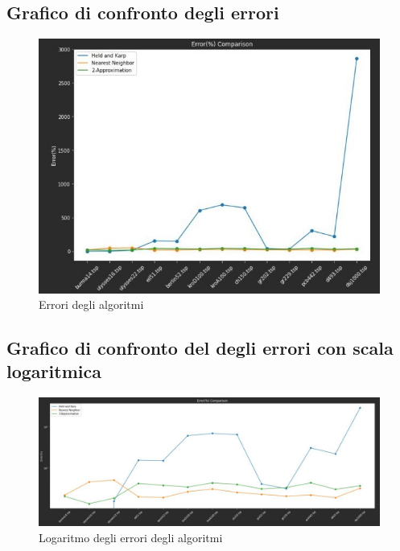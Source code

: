 \subsection{Grafico di confronto degli errori}
\begin{center}
	\begin{figure}[H]
		\centering
		\hspace{-1cm}\includegraphics[width=12cm]{Img/graph_error.jpg}
		\caption{Errori degli algoritmi}
	\end{figure}
\end{center}

\subsection{Grafico di confronto del degli errori con scala logaritmica}
\begin{center}
	\begin{figure}[H]
		\centering
		\hspace{-1cm}\includegraphics[width=16cm]{Img/graph_logerror.jpg}
		\caption{Logaritmo degli errori degli algoritmi}
	\end{figure}
\end{center}

	

\pagebreak